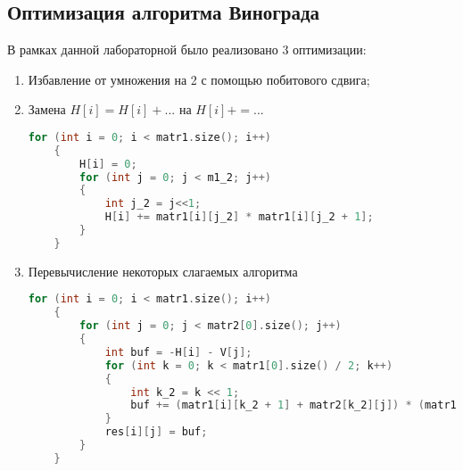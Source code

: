     \subsection{Оптимизация алгоритма Винограда}
    \par В рамках данной лабораторной было реализовано 3 оптимизации:
    \begin{enumerate}
    \item Избавление от умножения на 2 с помощью побитового сдвига;
    \item Замена \begin{math}H\left[i\right] = H\left[i\right] + ...\end{math} на \begin{math}H\left[i\right] += ...\end{math} \begin{lstlisting}[language=C++, label=lst:mult:VinogradOpt_2, caption=Оптимизация алгоритма винограда №1 и №2]
    for (int i = 0; i < matr1.size(); i++)
    {
        H[i] = 0;
        for (int j = 0; j < m1_2; j++)
        {
            int j_2 = j<<1;
            H[i] += matr1[i][j_2] * matr1[i][j_2 + 1];
        }
    }
    \end{lstlisting}
    \par \text{     }
    \par \text{     }

    \par \text{     }
    \par \text{     }

    \par \text{     }
    \par \text{     }

    \par \text{     }
    \par \text{     }
    \item Перевычисление некоторых слагаемых алгоритма \begin{lstlisting}[language=C++, label=lst:mult:VinogradOpt_2, caption=Оптимизация алгоритма винограда №3]
    for (int i = 0; i < matr1.size(); i++)
    {
        for (int j = 0; j < matr2[0].size(); j++)
        {
            int buf = -H[i] - V[j];
            for (int k = 0; k < matr1[0].size() / 2; k++)
            {
                int k_2 = k << 1;
                buf += (matr1[i][k_2 + 1] + matr2[k_2][j]) * (matr1[i][k_2] + matr2[k_2 + 1][j]);
            }
            res[i][j] = buf;
        }
    }
    \end{lstlisting}
    \end{enumerate}
